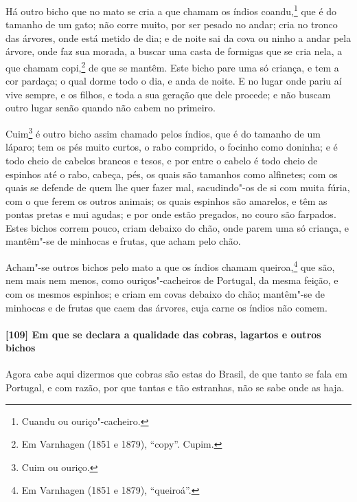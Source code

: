 Há outro bicho que no mato se cria a que chamam os índios coandu,\footnote{ Cuandu ou
ouriço"-cacheiro.} que é do tamanho de um gato; não corre muito, por ser pesado no andar;
cria no tronco das árvores, onde está metido de dia; e de noite sai da cova ou ninho a
andar pela árvore, onde faz sua morada, a buscar uma casta de formigas que se cria nela, a
que chamam copi,\footnote{ Em Varnhagen (1851 e 1879), ``copy''. Cupim.} de que se mantêm.
Este bicho pare uma só criança, e tem a cor pardaça; o qual dorme todo o dia, e anda de
noite. E no lugar onde pariu aí vive sempre, e os filhos, e toda a sua geração que dele
procede; e não buscam outro lugar senão quando não cabem no primeiro.

Cuim\footnote{ Cuim ou ouriço.} é outro bicho assim chamado pelos índios, que é do tamanho
de um láparo; tem os pés muito curtos, o rabo comprido, o focinho como doninha; e é todo
cheio de cabelos brancos e tesos, e por entre o cabelo é todo cheio de espinhos até o
rabo, cabeça, pés, os quais são tamanhos como alfinetes; com os quais se defende de quem
lhe quer fazer mal, sacudindo"-os de si com muita fúria, com o que ferem os outros animais;
os quais espinhos são amarelos, e têm as pontas pretas e mui agudas; e por onde estão
pregados, no couro são farpados. Estes bichos correm pouco, criam debaixo do chão, onde
parem uma só criança, e mantêm"-se de minhocas e frutas, que acham pelo chão.

Acham"-se outros bichos pelo mato a que os índios chamam queiroa,\footnote{ Em Varnhagen
(1851 e 1879), ``queiroá''.} que são, nem mais nem menos, como ouriços"-cacheiros de
Portugal, da mesma feição, e com os mesmos espinhos; e criam em covas debaixo do chão;
mantêm"-se de minhocas e de frutas que caem das árvores, cuja carne os índios não comem.

\paragraph{[109] Em que se declara a qualidade das cobras, lagartos e outros bichos}\quad
Agora cabe aqui dizermos que cobras são estas do Brasil, de que tanto se fala em Portugal,
e com razão, por que tantas e tão estranhas, não se sabe onde as haja.

